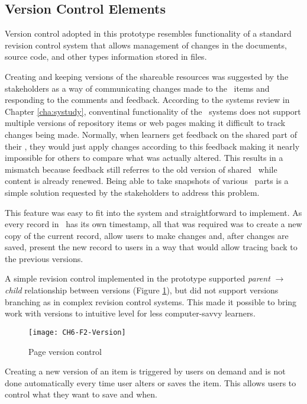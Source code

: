 \subsection{Version Control Elements}
\label{sec:version}

Version control adopted in this prototype resembles functionality of a standard
revision control system that allows management of changes in the documents,
source code, and other types information stored in files.

Creating and keeping versions of the shareable resources was suggested by the
stakeholders as a way of communicating changes made to the \ep~items and
responding to the comments and feedback. According to the systems review in
Chapter \ref{cha:systudy}, conventinal functionality of the \ep~systems does not
support multiple versions of repository items or web pages making it difficult
to track changes being made. Normally, when learners get feedback on the shared
part of their \ep, they would just apply changes according to this feedback
making it nearly impossible for others to compare what was actually altered.
This results in a mismatch because feedback still referres to the old version of
shared \ep~while content is already renewed. Being able to take snapshots of
various \ep~parts is a simple solution requested by the stakeholders to address
this problem.

This feature was easy to fit into the system and straightforward to implement.
As every record in \ep~has its own timestamp, all that was required was to
create a new copy of the current record, allow users to make changes and,
after changes are saved, present the new record to users in a way that would
allow tracing back to the previous versions.

A simple revision control implemented in the prototype supported \textit{parent}
$\to$ \textit{child} relationship between versions (Figure \ref{fig:version}),
but did not support versions branching as in complex revision control systems.
This made it possible to bring work with versions to intuitive level for less
computer-savvy learners.

\begin{figure}[htb]
\centering
\texttt{[image: CH6-F2-Version]}
\caption{Page version control}
\label{fig:version}
\end{figure}

Creating a new version of an item is triggered by users on demand and is not
done automatically every time user alters or saves the item. This allows users to
control what they want to save and when.

